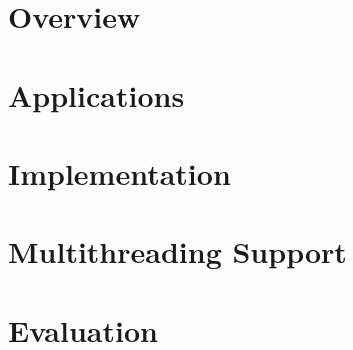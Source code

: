 \section{Overview}


\section{Applications}


\section{Implementation} 


\section{Multithreading Support}


\section{Evaluation}

